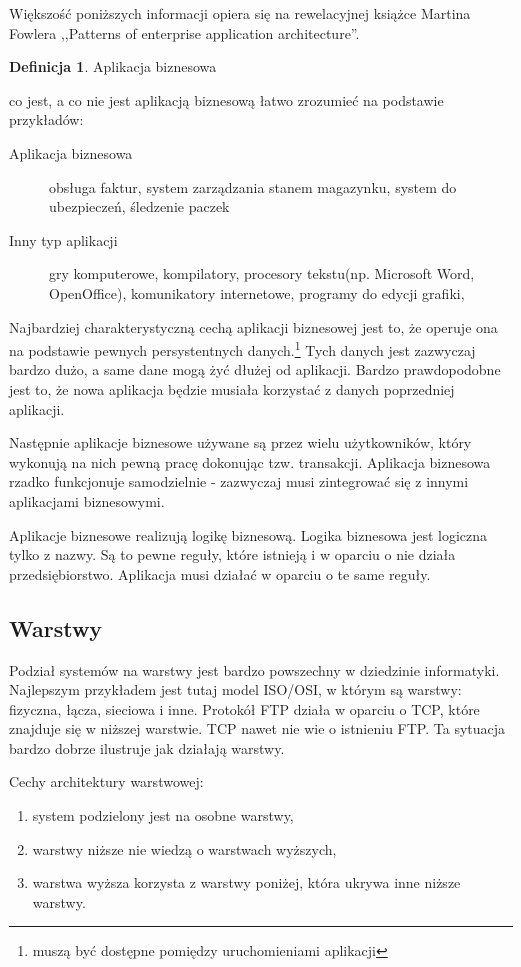 \documentclass[a4paper,onecolumn,oneside,11pt,wide,floatssmall]{mwrep}
\theoremstyle{definition}
\newtheorem{defn}{Definicja}[section]
\theoremstyle{plain}%
\theoremstyle{remark}
\begin{document}
Większość poniższych informacji opiera się na rewelacyjnej książce Martina Fowlera 
,,Patterns of enterprise application architecture''. \cite{fowler2003patterns}

\begin{defn}{Aplikacja biznesowa}

co jest, a co nie jest aplikacją biznesową łatwo zrozumieć na podstawie przykładów:
\begin{description}
  \item[Aplikacja biznesowa] obsługa faktur, system zarządzania stanem magazynku, system do ubezpieczeń, śledzenie 
  paczek
  \item[Inny typ aplikacji] gry komputerowe, kompilatory, procesory tekstu(np. Microsoft Word, OpenOffice), 
  komunikatory internetowe, programy do edycji grafiki, 
\end{description}
Najbardziej charakterystyczną cechą aplikacji biznesowej jest to, że operuje ona na podstawie pewnych persystentnych  
danych.\footnote{muszą być dostępne pomiędzy uruchomieniami aplikacji} Tych danych jest zazwyczaj bardzo dużo, a same 
dane mogą żyć dłużej od aplikacji. Bardzo prawdopodobne jest to, że nowa aplikacja będzie musiała korzystać z danych 
poprzedniej aplikacji.

Następnie aplikacje biznesowe używane są przez wielu użytkowników, który wykonują na nich pewną pracę dokonując tzw. 
transakcji. Aplikacja biznesowa rzadko funkcjonuje samodzielnie - zazwyczaj musi zintegrować się z innymi aplikacjami 
biznesowymi.

Aplikacje biznesowe realizują logikę biznesową. Logika biznesowa jest logiczna tylko z nazwy. Są to pewne reguły, 
które istnieją i w oparciu o nie działa przedsiębiorstwo. Aplikacja musi działać w oparciu o te same reguły.
\end{defn}

\subsection{Warstwy}
Podział systemów na warstwy jest bardzo powszechny w dziedzinie informatyki. Najlepszym przykładem jest tutaj model 
ISO/OSI, w którym są warstwy: fizyczna, łącza, sieciowa i inne. Protokół FTP działa w oparciu o TCP, które znajduje 
się w niższej warstwie. TCP nawet nie wie o istnieniu FTP. Ta sytuacja bardzo dobrze ilustruje jak działają warstwy.

Cechy architektury warstwowej:
\begin{enumerate}
  \item system podzielony jest na osobne warstwy,
  \item warstwy niższe nie wiedzą o warstwach wyższych,
  \item warstwa wyższa korzysta z warstwy poniżej, która ukrywa inne niższe warstwy.
\end{enumerate}
\end{document}
